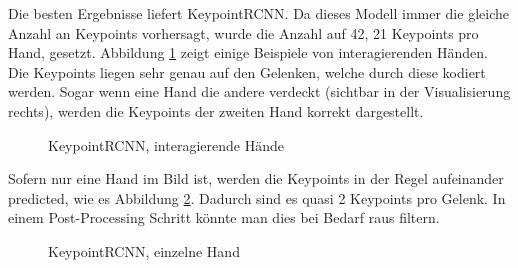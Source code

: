 Die besten Ergebnisse liefert KeypointRCNN. 
Da dieses Modell immer die gleiche Anzahl an Keypoints vorhersagt, wurde die Anzahl auf 42, 21 Keypoints pro Hand, gesetzt.
Abbildung \ref{fig:keypointrcnn_interagierend} zeigt einige Beispiele von interagierenden Händen.
Die Keypoints liegen sehr genau auf den Gelenken, welche durch diese kodiert werden.
Sogar wenn eine Hand die andere verdeckt (sichtbar in der Visualisierung rechts), werden die Keypoints der zweiten Hand korrekt dargestellt.\\
\begin{figure}[!htb]
    \centering
    \caption{KeypointRCNN, interagierende Hände}
    \label{fig:keypointrcnn_interagierend}
\end{figure} 
Sofern nur eine Hand im Bild ist, werden die Keypoints in der Regel aufeinander predicted, wie es Abbildung \ref{fig:keypointrcnn_single}. 
Dadurch sind es quasi 2 Keypoints pro Gelenk. 
In einem Post-Processing Schritt könnte man dies bei Bedarf raus filtern.
\begin{figure}[!htb]
    \centering
    \caption{KeypointRCNN, einzelne Hand}
    \label{fig:keypointrcnn_single}
\end{figure} 
